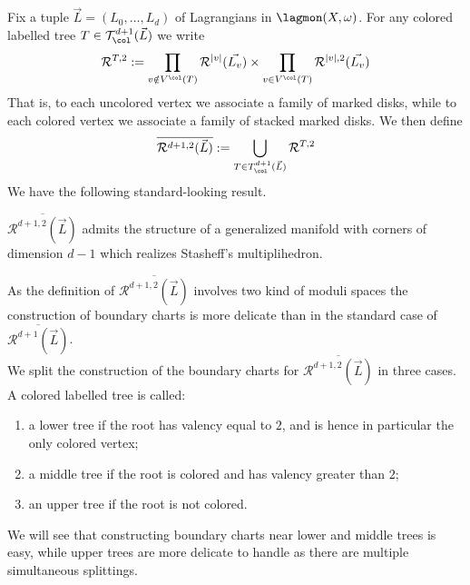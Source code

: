 	Fix a tuple $\vec{L}=(L_0,\ldots, L_d)$ of Lagrangians in $\lagmon(X,\omega)$. For any colored labelled tree $T\in \mathcal{T}^{d+1}_\col(\vec{L})$ we write $$\mathcal{R}^{T,2}:=\prod_{v\notin V^\col(T)}\mathcal{R}^{|v|}(\vec{L_v})\times \prod_{v\in V^\col(T)}\mathcal{R}^{|v|,2}(\vec{L_v}) $$ That is, to each uncolored vertex we associate a family of marked disks, while to each colored vertex we associate a family of stacked marked disks. We then define $$\overline{\mathcal{R}^{d+1,2}(\vec{L})}:=\bigcup_{T\in T^{d+1}_\col(\vec{L})}\mathcal{R}^{T,2}$$
	We have the following standard-looking result.
	\begin{lemma}
		$\overline{\mathcal{R}^{d+1,2}(\vec{L})}$ admits the structure of a generalized manifold with corners of dimension $d-1$ which realizes Stasheff's multiplihedron.
	\end{lemma}
	\noindent As the definition of $\overline{\mathcal{R}^{d+1,2}(\vec{L})}$ involves two kind of moduli spaces the construction of boundary charts is more delicate than in the standard case of $\overline{\mathcal{R}^{d+1}(\vec{L})}$.\\
	We split the construction of the boundary charts for $\overline{\mathcal{R}^{d+1,2}(\vec{L})}$ in three cases. A colored labelled tree is called:
	\begin{enumerate}
		\item a lower tree if the root has valency equal to $2$, and is hence in particular the only colored vertex;
		\item a middle tree if the root is colored and has valency greater than $2$;
		\item an upper tree if the root is not colored.
	\end{enumerate}
	We will see that constructing boundary charts near lower and middle trees is easy, while upper trees are more delicate to handle as there are multiple simultaneous splittings.\\
	
